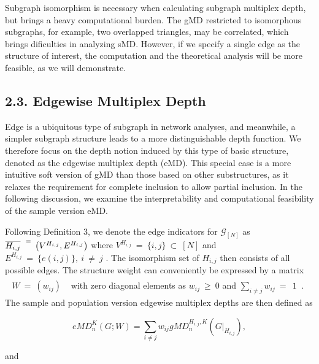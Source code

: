 \documentclass[
  10
]{article}
\begin{document}
Subgraph isomorphism is necessary when calculating subgraph multiplex
depth, but brings a heavy computational burden. The gMD restricted to
isomorphous subgraphs, for example, two overlapped triangles, may be
correlated, which brings dificulties in analyzing sMD. However, if we
specify a single edge as the structure of interest, the computation and
the theoretical analysis will be more feasible, as we will demonstrate.

\subsection{2.3. Edgewise Multiplex
Depth}\label{edgewise-multiplex-depth}

Edge is a ubiquitous type of subgraph in network analyses, and
meanwhile, a simpler subgraph structure leads to a more distinguishable
depth function. We therefore focus on the depth notion induced by this
type of basic structure, denoted as the edgewise multiplex depth (eMD).
This special case is a more intuitive soft version of gMD than those
based on other substructures, as it relaxes the requirement for complete
inclusion to allow partial inclusion. In the following discussion, we
examine the interpretability and computational feasibility of the sample
version eMD.

Following Definition 3, we denote the edge indicators for
\(\mathcal { G } _ { [ N ] }\) as
\(\overline { { H _ { i , j } } } ^ { \mathrm { ~ \scriptsize ~ = ~ } } \left( V ^ { H _ { i , j } } , E ^ { H _ { i , j } } \right)\)
where \(V ^ { H _ { i , j } } ~ = ~ \{ i , j \} ~ \subset ~ [ N ]\) and
\(E ^ { H _ { i , j } } ~ = ~ \big \{ e ( i , j ) \big \} , ~ i ~ \neq ~ j\)
. The isomorphism set of \(H _ { i , j }\) then consists of all possible
edges. The structure weight can conveniently be expressed by a matrix
\(\begin{array} { r } { \begin{array} { r } { W \ = \ ( w _ { i j } ) } \end{array} } \end{array}\)
with zero diagonal elements as \(w _ { i j } ~ \geq ~ 0\) and
\(\textstyle \sum _ { i \neq j } w _ { i j } \ = \ { \mathrm { ~ 1 ~ } }\)
. The sample and population version edgewise multiplex depths are then
defined as

\[
e M D _ {n} ^ {K} (G; W) = \sum_ {i \neq j} w _ {i j} g M D _ {n} ^ {H _ {i, j}, K} (G | _ {H _ {i, j}}),\tag{6}
\]

and
\end{document}
